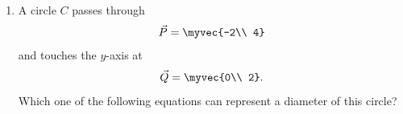 \begin{enumerate}[label=\arabic*.,ref=\thesubsection.\theenumi]
\item A circle $C$ passes through 
\begin{equation} 
\vec{P}=\myvec{-2\\ 4} 
\label{eq:circle_7_p}
\end{equation} 
and touches the $y$-axis at 
\begin{equation} 
\vec{Q}=\myvec{0\\ 2}. 
\label{eq:circle_7_q}
\end{equation}
Which one of the  following equations can represent a diameter of this circle?
\begin{enumerate}[label=(\roman*)]
\end{enumerate}


\end{enumerate}
